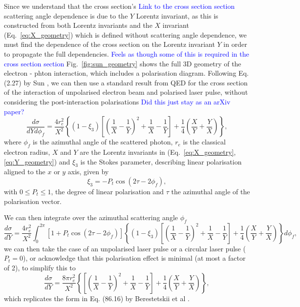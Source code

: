 \documentclass[../main.tex]{subfiles}
\begin{document}
Since we understand that the cross section's \textcolor{blue}{Link to the cross section section} scattering angle dependence is due to the $Y$ Lorentz invariant, as this is constructed from both Lorentz invariants and the $X$ invariant (Eq.~\ref{eq:X_geometry}) which is defined without scattering angle dependence, we must find the dependence of the cross section on the Lorentz invariant $Y$ in order to propagate the full dependencies. \textcolor{blue}{Feels as though some of this is required in the cross section section} Fig.~\ref{fig:sun_geometry} shows the full 3D geometry of the electron - phton interaction, which includes a polarisation diagram. Following Eq. (2.27) by Sun \cite{sun2009characterizations}, we can then use a standard result from QED for the cross section of the interaction of unpolarised electron beam and polarised laser pulse, without considering the post-interaction polarisations \cite{grozin2002complete} \textcolor{blue}{Did this just stay as an arXiv paper?}
\begin{equation}
\frac{d\sigma}{dYd\phi_{f}} = \frac{4r_{e}^{2}}{X^{2}}\left\{\left(1-\xi_{3}\right)\left[\left(\frac{1}{X}-\frac{1}{Y}\right)^{2}+\frac{1}{X}-\frac{1}{Y}\right]+\frac{1}{4}\left(\frac{X}{Y}+\frac{Y}{X}\right)\right\},
\label{eq:differential_cross_section_Y_phif}
\end{equation}
where $\phi_{f}$ is the azimuthal angle of the scattered photon, $r_{e}$ is the classical electron radius, $X$ and $Y$ are the Lorentz invariants in (Eq.~\ref{eq:X_geometry}, \ref{eq:Y_geometry}) and $\xi_{3}$ is the Stokes parameter, describing linear polarisation aligned to the $x$ or $y$ axis, given by
\begin{equation}
\xi_{3} = -P_{t}\cos\left(2\tau-2\phi_{f}\right),
\label{eq:stokes_3}
\end{equation} 
with $0 \leq P_{t} \leq 1$, the degree of linear polarisation and $\tau$ the azimuthal angle of the polarisation vector. 

We can then integrate over the azimuthal scattering angle $\phi_{f}$
\begin{equation}
\frac{d\sigma}{dY} = \frac{4r_{e}^{2}}{X^{2}}\int_{0}^{2\pi}\left[1+P_{t}\cos\left(2\tau-2\phi_{f}\right)\right]\left\{\left(1-\xi_{3}\right)\left[\left(\frac{1}{X}-\frac{1}{Y}\right)^{2}+\frac{1}{X}-\frac{1}{Y}\right]+\frac{1}{4}\left(\frac{X}{Y}+\frac{Y}{X}\right)\right\} d\phi_{f}, 
\label{eq:phif_integral}
\end{equation}
we can then take the case of an unpolarised laser pulse or a circular laser pulse ($P_{t} = 0$), or acknowledge that this polarisation effect is minimal (at most a factor of 2), to simplify this to
\begin{equation}
\frac{d\sigma}{dY} = \frac{8\pi r_{e}^{2}}{X^{2}}\left\{\left[\left(\frac{1}{X}-\frac{1}{Y}\right)^{2}+\frac{1}{X}-\frac{1}{Y}\right]+\frac{1}{4}\left(\frac{X}{Y}+\frac{Y}{X}\right)\right\},
\label{eq:cross_section_Y_berestetskii_form}
\end{equation}
which replicates the form in Eq. (86.16) by Berestetskii et al \cite{berestetskii1982quantum}.
\end{document}
